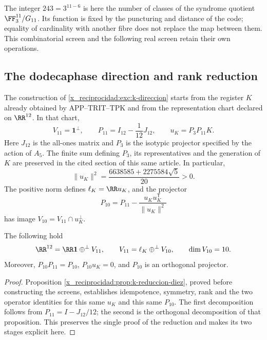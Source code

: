 The integer \(243=3^{11-6}\) is here the number of classes
of the syndrome quotient \(\FF_3^{11}/G_{11}\). Its
function is fixed by the puncturing and distance of the
code; equality of cardinality with another fibre does not replace
the map between them. This combinatorial screen and the
following real screen retain their own operations.

\subsection{The dodecaphase direction and rank reduction}

The construction of \ref{x_reciprocidad:exc:k-direccion} starts from the register
\(K\) already obtained by APP--TRIT--TPK and from the representation
chart declared on \(\RR^{12}\). In that chart,
\begin{equation}
 V_{11}=\mathbf1^\perp,\qquad
 P_{11}=I_{12}-\frac1{12}J_{12},\qquad
 u_K=P_3P_{11}K.
 \label{x_reciprocidad:iv:eq:p11-uk}
\end{equation}
Here \(J_{12}\) is the all-ones matrix and \(P_3\) is the
isotypic projector specified by the action of \(A_5\).
The finite sum defining \(P_3\), its representatives and the
generation of \(K\) are preserved in the cited section of
this same article. In particular,
\[
 \|u_K\|^2=\frac{6638585+2275584\sqrt5}{20}>0.
\]
The positive norm defines \(\ell_K=\RR u_K\), and the
projector
\begin{equation}
 P_{10}=P_{11}-\frac{u_Ku_K^{\mathsf T}}{\|u_K\|^2}
 \label{x_reciprocidad:iv:eq:p10}
\end{equation}
has image \(V_{10}=V_{11}\cap u_K^\perp\).

\begin{proposition}
\label{x_reciprocidad:iv:prop:12-11-10}
The following hold
\[
 \RR^{12}=\RR\mathbf1\mathbin{\oplus^\perp}V_{11},\qquad
 V_{11}=\ell_K\mathbin{\oplus^\perp}V_{10},\qquad
 \dim V_{10}=10.
\]
Moreover, \(P_{10}P_{11}=P_{10}\), \(P_{10}u_K=0\), and
\(P_{10}\) is an orthogonal projector.
\end{proposition}
\begin{proof}
Proposition \ref{x_reciprocidad:prop:k-reduccion-diez}, proved before
constructing the screens, establishes idempotence, symmetry, rank and
the two operator identities for this same \(u_K\) and this same
\(P_{10}\). The first decomposition follows from
\(P_{11}=I-J_{12}/12\); the second is the orthogonal decomposition
of that proposition. This preserves the single proof of the
reduction and makes its two stages explicit here.
\end{proof}

